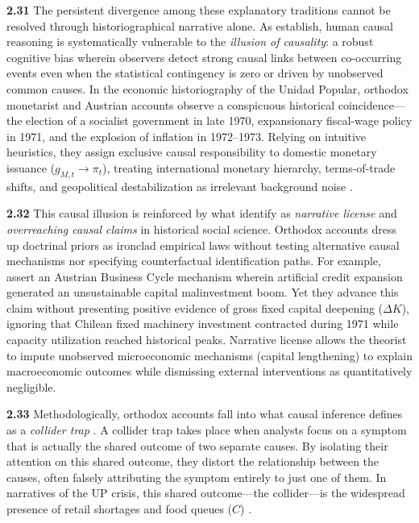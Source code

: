 \textbf{2.31} The persistent divergence among these explanatory traditions cannot be resolved through historiographical narrative alone. As \citet{BlancoMatute2018} establish, human causal reasoning is systematically vulnerable to the \emph{illusion of causality}: a robust cognitive bias wherein observers detect strong causal links between co-occurring events even when the statistical contingency is zero or driven by unobserved common causes. In the economic historiography of the Unidad Popular, orthodox monetarist and Austrian accounts observe a conspicuous historical coincidence---the election of a socialist government in late 1970, expansionary fiscal-wage policy in 1971, and the explosion of inflation in 1972--1973. Relying on intuitive heuristics, they assign exclusive causal responsibility to domestic monetary issuance ($g_{M,t} \to \pi_t$), treating international monetary hierarchy, terms-of-trade shifts, and geopolitical destabilization as irrelevant background noise \citep{Edwards2024,EspinosaVejar2025}.

\textbf{2.32} This causal illusion is reinforced by what \citet{IschEtAl2026} identify as \emph{narrative license} and \emph{overreaching causal claims} in historical social science. Orthodox accounts dress up doctrinal priors as ironclad empirical laws without testing alternative causal mechanisms nor specifying counterfactual identification paths. For example, \citet{EspinosaVejar2025} assert an Austrian Business Cycle mechanism wherein artificial credit expansion generated an unsustainable capital malinvestment boom. Yet they advance this claim without presenting positive evidence of gross fixed capital deepening ($\Delta K$), ignoring that Chilean fixed machinery investment contracted during 1971 while capacity utilization reached historical peaks. Narrative license allows the theorist to impute unobserved microeconomic mechanisms (capital lengthening) to explain macroeconomic outcomes while dismissing external interventions as quantitatively negligible.

\textbf{2.33} Methodologically, orthodox accounts fall into what causal inference defines as a \emph{collider trap} \citep{Pearl2009}. A collider trap takes place when analysts focus on a symptom that is actually the shared outcome of two separate causes. By isolating their attention on this shared outcome, they distort the relationship between the causes, often falsely attributing the symptom entirely to just one of them. In narratives of the UP crisis, this shared outcome---the collider---is the widespread presence of retail shortages and food queues ($C$) \citep{Edwards2024}. 

